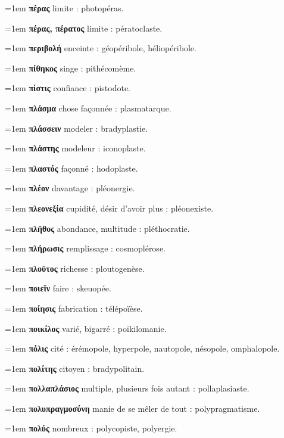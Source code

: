 \hangindent=1em \textbf{πέρας} limite : photopéras.\par
\hangindent=1em \textbf{πέρας, πέρατος} limite : pératoclaste.\par
\hangindent=1em \textbf{περιβολή} enceinte : géopéribole, héliopéribole.\par
\hangindent=1em \textbf{πίθηκος} singe : pithécomème.\par
\hangindent=1em \textbf{πίστις} confiance : pistodote.\par
\hangindent=1em \textbf{πλάσμα} chose façonnée : plasmatarque.\par
\hangindent=1em \textbf{πλάσσειν} modeler : bradyplastie.\par
\hangindent=1em \textbf{πλάστης} modeleur : iconoplaste.\par
\hangindent=1em \textbf{πλαστός} façonné : hodoplaste.\par
\hangindent=1em \textbf{πλέον} davantage : pléonergie.\par
\hangindent=1em \textbf{πλεονεξία} cupidité, désir d'avoir plus : pléonexiste.\par
\hangindent=1em \textbf{πλῆθος} abondance, multitude : pléthocratie.\par
\hangindent=1em \textbf{πλήρωσις} remplissage : cosmoplérose.\par
\hangindent=1em \textbf{πλοῦτος} richesse : ploutogenèse.\par
\hangindent=1em \textbf{ποιεῖν} faire : skeuopée.\par
\hangindent=1em \textbf{ποίησις} fabrication : télépoïèse.\par
\hangindent=1em \textbf{ποικίλος} varié, bigarré : poïkilomanie.\par
\hangindent=1em \textbf{πόλις} cité : érémopole, hyperpole, nautopole, nésopole, omphalopole.\par
\hangindent=1em \textbf{πολίτης} citoyen : bradypolitain.\par
\hangindent=1em \textbf{πολλαπλάσιος} multiple, plusieurs fois autant : pollaplasiaste.\par
\hangindent=1em \textbf{πολυπραγμοσύνη} manie de se mêler de tout : polypragmatisme.\par
\hangindent=1em \textbf{πολύς} nombreux : polycopiste, polyergie.\par
